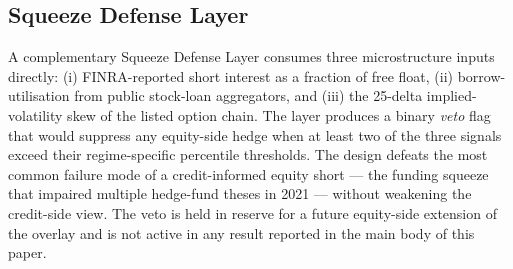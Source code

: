 \documentclass[11pt,letterpaper]{article}
\begin{document}
\subsection{Squeeze Defense Layer}
\label{app:squeeze-defense}

A complementary Squeeze Defense Layer consumes three microstructure
inputs directly: (i) FINRA-reported short interest as a fraction of
free float, (ii) borrow-utilisation from public stock-loan
aggregators, and (iii) the 25-delta implied-volatility skew of the
listed option chain. The layer produces a binary \emph{veto} flag
that would suppress any equity-side hedge when at least two of the
three signals exceed their regime-specific percentile thresholds.
The design defeats the most common failure mode of a
credit-informed equity short --- the funding squeeze that impaired
multiple hedge-fund theses in 2021 --- without weakening the
credit-side view. The veto is held in reserve for a future
equity-side extension of the overlay and is not active in any
result reported in the main body of this paper.
\end{document}
